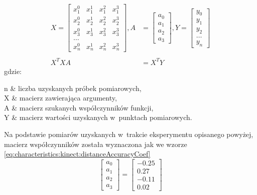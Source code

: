 \begin{equation}
	\begin{split}
		X = 	\begin{bmatrix}
		x_1^0&x_1^1&x_1^2&x_1^3\\
		x_2^0&x_2^1&x_2^2&x_2^3\\
		x_3^0&x_3^1&x_3^2&x_3^3\\
		\dots\\
		x_n^0&x_n^1&x_n^2&x_n^3
		\end{bmatrix} ,
		A &= 	\begin{bmatrix}
		a_0\\a_1\\a_2\\a_3
		\end{bmatrix} ,
		Y = 
		\begin{bmatrix}
			y_0 \\y_1\\y_2\\\dots\\y_n
		\end{bmatrix} \\
		& \\
		X^TXA &= X^TY
	\end{split}
	\label{eq:characteristics:kinect:distanceAccuracyPoly}
\end{equation}
gdzie:
\begin{conditions}
	n			& liczba uzyskanych próbek pomiarowych,																\\
	X			& macierz zawierająca argumenty,																\\
	A			& macierz szukanych współczynników funkcji,																\\
	Y			& macierz wartości uzyskanych w~punktach pomiarowych.																\\
\end{conditions}
																																							
																																							
Na podstawie pomiarów uzyskanych w~trakcie eksperymentu opisanego powyżej, macierz współczynników została wyznaczona jak we wzorze \ref{eq:characteristics:kinect:distanceAccuracyCoef}
\begin{equation}
	\label{eq:characteristics:kinect:distanceAccuracyCoef}
	\begin{bmatrix}
		a_0 \\a_1\\a_2\\a_3
	\end{bmatrix} = 
	\begin{bmatrix}
		- 0.25 \\  0.27 \\- 0.11\\0.02		
	\end{bmatrix}	
\end{equation}
																																							
